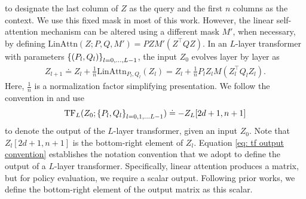 \documentclass{article}
\newcommand{\newtext}[1]{{#1}}
\newcommand{\R}{\mathbb{R}}
\newcommand{\attn}{\text{LinAttn}}
\newcommand{\tf}{\text{TF}}
\begin{document}
to designate the last column of $Z$ as the query and the first $n$ columns as the context.
We use this fixed mask in most of this work. 
However, the linear self-attention mechanism can be altered using a different mask $M'$, when necessary, by defining $\attn(Z; P, Q, M') = PZM'(Z^\top QZ)$.
In an $L$-layer transformer with parameters $\qty{(P_l, Q_l)}_{l=0,\dots, L-1}$, the input $Z_0$ evolves layer by layer as
\begin{align}
    \textstyle Z_{l+1} \doteq Z_l + \frac{1}{n} \attn_{P_l, Q_l}(Z_l) = Z_l + \frac{1}{n} P_l Z_l M(Z_l^\top Q_l Z_l). \label{eq: Z_l update}
\end{align}
Here, $\frac{1}{n}$ is a normalization factor simplifying presentation.
We follow the convention in \citet{vonoswald2023transformers,ahn2024transformers} and use
\begin{align}
    \textstyle \tf_L(Z_0; \qty{P_l, Q_l}_{l=0,1,\dots L-1} ) \doteq -Z_L[2d+1, n+1] \label{eq: tf output convention}
\end{align}
to denote the output of the $L$-layer transformer,
given an input $Z_0$. Note that $Z_l[2d+1, n+1]$ is the bottom-right element of $Z_l$. \newtext{Equation \eqref{eq: tf output convention} establishes the notation convention that we adopt to define the output of a $L$-layer transformer. Specifically, linear attention produces a matrix, but for policy evaluation, we require a scalar output. Following prior works, we define the bottom-right element of the output matrix as this scalar.}
\end{document}
